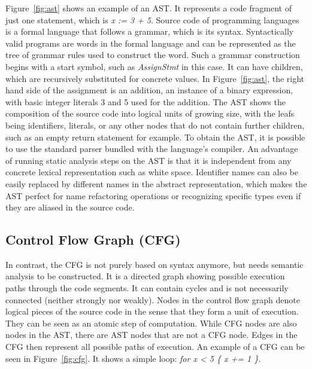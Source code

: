 Figure~\ref{fig:ast} shows an example of an \acrshort{AST}.
It represents a code fragment of just one statement, which is \textit{x := 3 + 5}.
Source code of programming languages is a formal language that follows a grammar, which is its syntax.
Syntactically valid programs are words in the formal language and can be represented as the tree of grammar rules used
to construct the word.
Such a grammar construction begins with a start symbol, such as \textit{AssignStmt} in this case.
It can have children, which are recursively substituted for concrete values.
In Figure~\ref{fig:ast}, the right hand side of the assignment is an addition, an instance of a binary expression, with
basic integer literals 3 and 5 used for the addition.
The \acrshort{AST} shows the composition of the source code into logical units of growing size, with the leafs being
identifiers, literals, or any other nodes that do not contain further children, such as an empty return statement for
example.
To obtain the \acrshort{AST}, it is possible to use the standard parser bundled with the language's compiler.
An advantage of running static analysis steps on the \acrshort{AST} is that it is independent from any concrete lexical
representation such as white space.
Identifier names can also be easily replaced by different names in the abstract representation, which makes the
\acrshort{AST} perfect for name refactoring operations or recognizing specific types even if they are aliased in the
source code.





\subsection{Control Flow Graph (CFG)}\label{subsec:background:static-code-analysis:cfg}

In contrast, the \acrshort{CFG} is not purely based on syntax anymore, but needs semantic analysis to be constructed.
It is a directed graph showing possible execution paths through the code segments.
It can contain cycles and is not necessarily connected (neither strongly nor weakly).
Nodes in the control flow graph denote logical pieces of the source code in the sense that they form a unit of
execution.
They can be seen as an atomic step of computation.
While \acrshort{CFG} nodes are also nodes in the \acrshort{AST}, there are \acrshort{AST} nodes that are not a
\acrshort{CFG} node.
Edges in the \acrshort{CFG} then represent all possible paths of execution.
An example of a \acrshort{CFG} can be seen in Figure~\ref{fig:cfg}.
It shows a simple loop: \textit{for x < 5 \{ x += 1 \}}.

